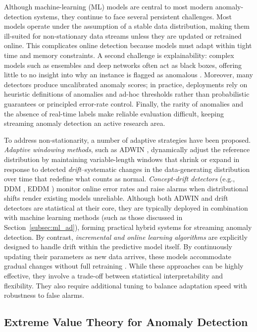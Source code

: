\documentclass{statsmsc}
\begin{document}
Although machine-learning (ML) models are central to most modern anomaly-detection systems, 
they continue to face several persistent challenges. Most models operate under the assumption of a stable data distribution,
making them ill-suited for non-stationary data streams unless they are updated or retrained online. 
This complicates online detection because models must adapt within tight time and memory constraints. A second challenge is 
explainability: complex models such as ensembles and deep networks often act as black boxes, offering little to no insight 
into why an instance is flagged as anomalous \citep{li2023explainable}. Moreover, many detectors produce uncalibrated anomaly
scores; in practice, deployments rely on heuristic definitions of anomalies and ad-hoc thresholds rather than probabilistic
guarantees or principled error-rate control. Finally, the rarity of anomalies and the absence of real-time labels make reliable
evaluation difficult, keeping streaming anomaly detection an active research area.

To address non-stationarity, a number of adaptive strategies have been proposed. 
\emph{Adaptive windowing methods}, such as ADWIN \citep{bifet2007learning}, 
dynamically adjust the reference distribution by maintaining variable-length windows that shrink or expand in response 
to detected \emph{drift}--systematic changes in the data-generating distribution over time that redefine what counts as normal.
\emph{Concept-drift detectors} (e.g., DDM \citep{gama2004ddm}, EDDM \citep{baena2006eddm}) monitor online error rates and 
raise alarms when distributional shifts render existing models unreliable. Although both ADWIN and drift detectors are 
statistical at their core, they are typically deployed in combination with machine learning methods (such as those discussed 
in Section~\ref{subsec:ml_ad}), forming practical hybrid systems for streaming anomaly detection. By contrast, 
\emph{incremental and online learning algorithms} are explicitly designed to handle drift within the predictive model itself.
By continuously updating their parameters as new data arrives, these models accommodate gradual changes without full retraining
\citep{lu2020learning}. While these approaches can be highly effective, they involve a trade-off between statistical interpretability
and flexibility. They also require additional tuning to balance adaptation speed with robustness to false alarms.

\subsection{Extreme Value Theory for Anomaly Detection}
\end{document}

